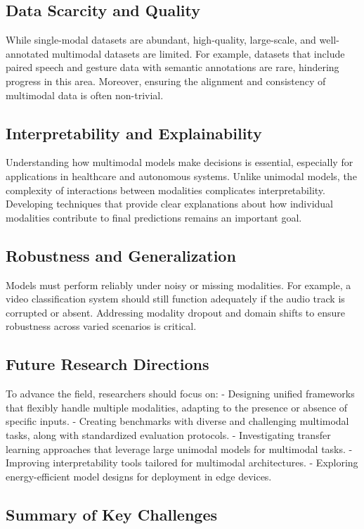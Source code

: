 \documentclass[sigconf]{acmart}
\begin{document}
\subsection{Data Scarcity and Quality}
While single-modal datasets are abundant, high-quality, large-scale, and well-annotated multimodal datasets are limited. For example, datasets that include paired speech and gesture data with semantic annotations are rare, hindering progress in this area. Moreover, ensuring the alignment and consistency of multimodal data is often non-trivial.

\subsection{Interpretability and Explainability}
Understanding how multimodal models make decisions is essential, especially for applications in healthcare and autonomous systems. Unlike unimodal models, the complexity of interactions between modalities complicates interpretability. Developing techniques that provide clear explanations about how individual modalities contribute to final predictions remains an important goal.

\subsection{Robustness and Generalization}
Models must perform reliably under noisy or missing modalities. For example, a video classification system should still function adequately if the audio track is corrupted or absent. Addressing modality dropout and domain shifts to ensure robustness across varied scenarios is critical.

\subsection{Future Research Directions}
To advance the field, researchers should focus on:
- Designing unified frameworks that flexibly handle multiple modalities, adapting to the presence or absence of specific inputs.
- Creating benchmarks with diverse and challenging multimodal tasks, along with standardized evaluation protocols.
- Investigating transfer learning approaches that leverage large unimodal models for multimodal tasks.
- Improving interpretability tools tailored for multimodal architectures.
- Exploring energy-efficient model designs for deployment in edge devices.

\subsection*{Summary of Key Challenges}
\end{document}
